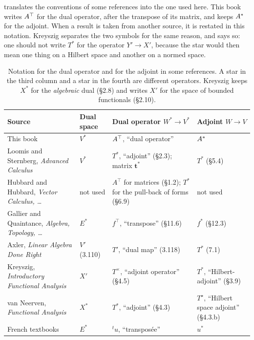 \begin{notechapter}
 translates the conventions of some references
into the one used here. This book writes $A^{\top}$ for the dual operator,
after the transpose of its matrix, and keeps $A^{*}$ for the adjoint.
When a result is taken from another source, it is restated in this
notation. Kreyszig separates the two symbols for the same reason, and
says so: one should not write $T^*$ for the operator $Y'\to X'$, because
the star would then mean one thing on a Hilbert space and another on a
normed space.

\begin{table}[ht]
\centering
\small
\begin{tabular}{@{}p{4.6cm}p{1.4cm}p{4.2cm}p{3.2cm}@{}}
\toprule
Source & Dual space & Dual operator $W^*\to V^*$ & Adjoint $W\to V$ \\
\midrule
This book & $V^*$ & $A^{\top}$, ``dual operator'' & $A^{*}$ \\
Loomis and Sternberg, \emph{Advanced Calculus} & $V^*$
  & $T^*$, ``adjoint'' (\S2.3); matrix $\mathbf t^*$ & $T^*$ (\S5.4) \\
Hubbard and Hubbard, \emph{Vector Calculus, \dots} & not used
  & $A^\top$ for matrices (\S1.2); $T^*$ for the pull-back of forms
    (\S6.9) & not used \\
Gallier and Quaintance, \emph{Algebra, Topology, \dots} & $E^*$
  & $f^\top$, ``transpose'' (\S11.6) & $f^*$ (\S12.3) \\
Axler, \emph{Linear Algebra Done Right} & $V'$ (3.110)
  & $T'$, ``dual map'' (3.118) & $T^*$ (7.1) \\
Kreyszig, \emph{Introductory Functional Analysis} & $X'$
  & $T^\times$, ``adjoint operator'' (\S4.5)
  & $T^*$, ``Hilbert-adjoint'' (\S3.9) \\
van Neerven, \emph{Functional Analysis} & $X^*$
  & $T^*$, ``adjoint'' (\S4.3)
  & $T^\star$, ``Hilbert space adjoint'' (\S4.3.b) \\
French textbooks & $E^*$ & ${}^t\!u$, ``transpos\'ee'' & $u^*$ \\
\bottomrule
\end{tabular}
\caption{Notation for the dual operator and for the adjoint in some
references. A star in the third column and a star in the fourth are
different operators. Kreyszig keeps $X^*$ for the \emph{algebraic} dual
(\S2.8) and writes $X'$ for the space of bounded functionals (\S2.10).}
\label{duality:tab:notation}
\end{table}


\end{notechapter}

